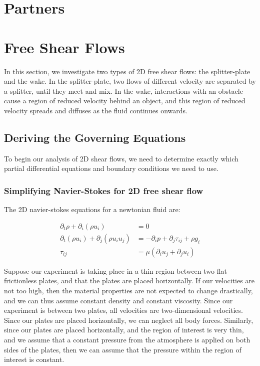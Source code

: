 \documentclass{article}
\begin{document}
\section{Partners}



\section{Free Shear Flows}

In this section, we investigate two types of 2D free shear flows:
	the splitter-plate and the wake.
In the splitter-plate, two flows of different velocity are separated by
	a splitter, until they meet and mix.
In the wake, interactions with an obstacle cause a region of reduced
	velocity behind an object, and this region of reduced
	velocity spreads and diffuses as the fluid continues onwards.

\subsection{Deriving the Governing Equations}

To begin our analysis of 2D shear flows, we need to determine exactly 
	which partial differential equations and boundary conditions
	we need to use.

\subsubsection{Simplifying Navier-Stokes for 2D free shear flow}

The 2D navier-stokes equations for a newtonian fluid are:

\begin{align}
\partial_t \rho + \partial_i \left( \rho u_i \right) & = 0 \\
\partial_t \left( \rho u_i \right) + \partial_j \left( \rho u_i u_j \right)
	& = - \partial_i p + \partial_j \tau_{ij} + \rho g_i\\
\tau_{ij} & = \mu \left( \partial_i u_j + \partial_j u_i \right)
\end{align}

Suppose our experiment is taking place in a thin region between two
	flat frictionless plates, and that the plates are placed horizontally.
If our velocities are not too high, then the material properties are not
	expected to change drastically, and we can thus assume constant
	density and constant viscosity.
Since our experiment is between two plates, all velocities are two-dimensional
	velocities.
Since our plates are placed horizontally, we can neglect all body forces.
Similarly, since our plates are placed horizontally, and the region
	of interest is very thin, and we assume that a constant pressure
	from the atmosphere is applied on both sides of the plates,
	then we can assume that the pressure within the region of 
	interest is constant.
\end{document}
